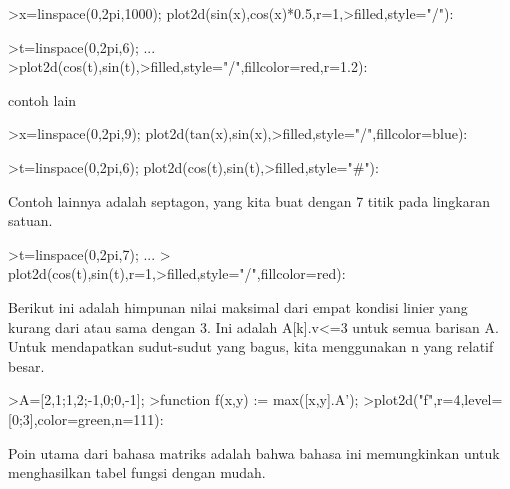 \documentclass[a4paper,10pt]{article}
\begin{document}
\begin{eulernotebook}
\begin{eulercomment}
\begin{eulercomment}
\begin{eulerprompt}
>x=linspace(0,2pi,1000); plot2d(sin(x),cos(x)*0.5,r=1,>filled,style="/"):
\end{eulerprompt}
\begin{eulerprompt}
>t=linspace(0,2pi,6); ...
>plot2d(cos(t),sin(t),>filled,style="/",fillcolor=red,r=1.2):
\end{eulerprompt}
\eulersubheading{}
\begin{eulercomment}
contoh lain
\end{eulercomment}
\begin{eulerprompt}
>x=linspace(0,2pi,9); plot2d(tan(x),sin(x),>filled,style="/",fillcolor=blue):
\end{eulerprompt}
\eulersubheading{}
\begin{eulerprompt}
>t=linspace(0,2pi,6); plot2d(cos(t),sin(t),>filled,style="#"):
\end{eulerprompt}
\begin{eulercomment}
Contoh lainnya adalah septagon, yang kita buat dengan 7 titik pada
lingkaran satuan.
\end{eulercomment}
\begin{eulerprompt}
>t=linspace(0,2pi,7);  ...
> plot2d(cos(t),sin(t),r=1,>filled,style="/",fillcolor=red):
\end{eulerprompt}
\begin{eulercomment}
Berikut ini adalah himpunan nilai maksimal dari empat kondisi linier
yang kurang dari atau sama dengan 3. Ini adalah A[k].v\textless{}=3 untuk semua
barisan A. Untuk mendapatkan sudut-sudut yang bagus, kita menggunakan
n yang relatif besar.
\end{eulercomment}
\begin{eulerprompt}
>A=[2,1;1,2;-1,0;0,-1];
>function f(x,y) := max([x,y].A');
>plot2d("f",r=4,level=[0;3],color=green,n=111):
\end{eulerprompt}
\begin{eulercomment}
Poin utama dari bahasa matriks adalah bahwa bahasa ini memungkinkan
untuk menghasilkan tabel fungsi dengan mudah.
\end{eulercomment}

\end{eulercomment}
\end{eulercomment}
\end{eulernotebook}
\end{document}
